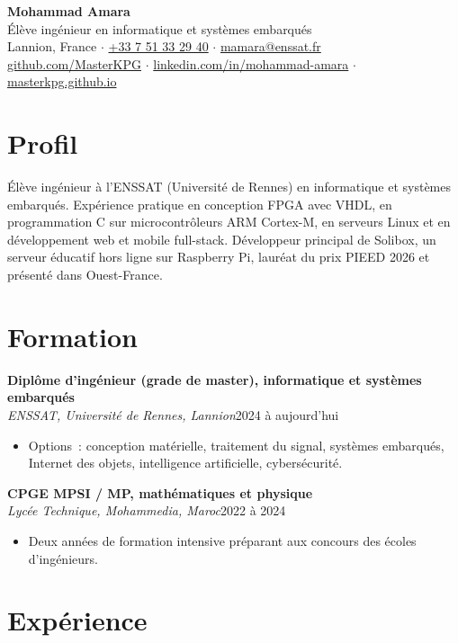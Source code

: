 \documentclass[10pt,a4paper]{article}
\newcommand{\entry}[3]{%
  \par\addvspace{6pt}%
  \noindent\textbf{#1}\\
  \textit{#2}\hfill #3\par
}
\begin{document}
\begin{center}
  {\LARGE\bfseries Mohammad Amara}\\[5pt]
  {\large Élève ingénieur en informatique et systèmes embarqués}\\[7pt]
  Lannion, France \quad$\cdot$\quad
  \href{tel:+33751332940}{+33 7 51 33 29 40} \quad$\cdot$\quad
  \href{mailto:mamara@enssat.fr}{mamara@enssat.fr}\\[2pt]
  \href{https://github.com/MasterKPG}{github.com/MasterKPG} \quad$\cdot$\quad
  \href{https://www.linkedin.com/in/mohammad-amara/}{linkedin.com/in/mohammad-amara} \quad$\cdot$\quad
  \href{https://masterkpg.github.io}{masterkpg.github.io}
\end{center}

\section*{Profil}

Élève ingénieur à l'ENSSAT (Université de Rennes) en informatique et systèmes embarqués. Expérience
pratique en conception FPGA avec VHDL, en programmation C sur microcontrôleurs ARM Cortex-M, en
serveurs Linux et en développement web et mobile full-stack. Développeur principal de Solibox, un
serveur éducatif hors ligne sur Raspberry Pi, lauréat du prix PIEED 2026 et présenté dans
Ouest-France.

\section*{Formation}

\entry{Diplôme d'ingénieur (grade de master), informatique et systèmes embarqués}{ENSSAT, Université de Rennes, Lannion}{2024 à aujourd'hui}
\begin{itemize}
  \item Options~: conception matérielle, traitement du signal, systèmes embarqués, Internet des
        objets, intelligence artificielle, cybersécurité.
\end{itemize}

\entry{CPGE MPSI / MP, mathématiques et physique}{Lycée Technique, Mohammedia, Maroc}{2022 à 2024}
\begin{itemize}
  \item Deux années de formation intensive préparant aux concours des écoles d'ingénieurs.
\end{itemize}

\section*{Expérience}
\end{document}
